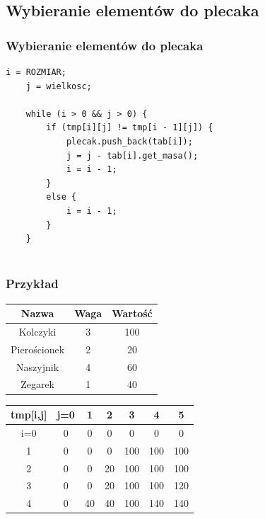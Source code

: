 \documentclass{beamer}
\begin{document}
\subsection{Wybieranie elementów do plecaka}
\begin{frame}[fragile]
\frametitle{Wybieranie elementów do plecaka}
\begin{lstlisting}[basicstyle=\small, tabsize=2]
	i = ROZMIAR;
	j = wielkosc;

	while (i > 0 && j > 0) {
		if (tmp[i][j] != tmp[i - 1][j]) {
			plecak.push_back(tab[i]);
			j = j - tab[i].get_masa();
			i = i - 1;
		}
		else {
			i = i - 1;
		}
	}
	
\end{lstlisting}
\end{frame}

\begin{frame}
	\frametitle{Przykład }
\begin{table}[]
\begin{tabular}{|c|c|c|}
\hline
Nazwa        & Waga & Wartość	\\ \hline
Kolczyki     & 3 	&  100 	\\ \hline
Pierościonek & 2    & 20 	\\ \hline
Naszyjnik    & 4    & 60 	\\ \hline
Zegarek      & 1    & 40 	\\ \hline
\end{tabular}
\end{table}
\begin{table}[]
\begin{tabular}{|c|c|c|c|c|c|c|}
\hline
tmp{[}i,j{]} & j=0 & 1 & 2 & 3 & 4 & 5 \\ \hline
i=0        & 0 & 0 & 0 & 0 & 0 & 0  \\ \hline
1          & 0 & 0 & 0 & 100 & 100 & 100  \\ \hline
2          & 0 & 0 & 20 & 100 & 100 & 100  \\ \hline
3          & 0 & 0 & 20 & 100 & 100 & 120  \\ \hline
4          & 0 & 40 & 40 & 100 & 140 & 140  \\ \hline
\end{tabular}
\end{table}
\end{frame}
\end{document}
